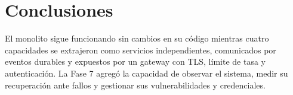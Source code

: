 \documentclass[11pt,a4paper]{article}
\begin{document}
\section{Conclusiones}
El monolito sigue funcionando sin cambios en su código mientras cuatro capacidades se extrajeron como servicios independientes, comunicados por eventos durables y expuestos por un gateway con TLS, límite de tasa y autenticación. La Fase 7 agregó la capacidad de observar el sistema, medir su recuperación ante fallos y gestionar sus vulnerabilidades y credenciales.
\end{document}
